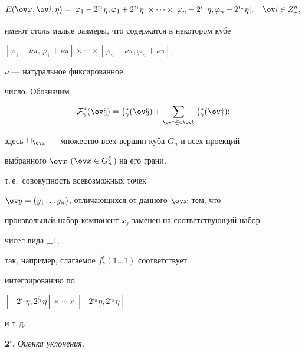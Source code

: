 $$ 


E(\ov\varphi,\ov i,\eta)=[\varphi_1-2^{i_1}\eta, 


\varphi_1+2^{i_1}\eta]\times\dotsb\times 


[\varphi_n-2^{i_n}\eta,


\varphi_n+2^{i_n}\eta],\quad \ov i\in Z^n_+,


$$ 


имеют столь малые размеры, что содержатся в некотором кубе 


$[\varphi_1-\nu\pi,\varphi_1+\nu\pi]\times\dotsb\times 


[\varphi_n-\nu\pi,\varphi_n+\nu\pi]$, 


$\nu$ --- натуральное фиксированное 


число. Обозначим 


\begin{equation} 


\cal F^*_\gamma(\ov x)=f^*_\gamma(\ov x)+ 


\sum_{\ov y\in\Pi{\ov x}}f^*_\gamma(\ov y); 


\end{equation} 


здесь $\Pi_{\ov x}$ --- множество всех вершин куба $G_n$ и всех проекций 


выбранного $\ov x$ ($\ov x\in G^\delta_n$) на его грани, 


т.\,е.~совокупность всевозможных точек 


$\ov y=(y_1\dotsc y_n)$, отличающихся от данного $\ov x$ тем, что 


произвольный набор компонент $x_j$ заменен на соответствующий набор 


чисел вида $\pm1$; 


так, например, слагаемое $f^*_\gamma(1\dotsc 1)$ соответствует 


интегрированию по 


$[-2^{i_1}\eta,2^{i_1}\eta]\times\dotsb\times 


[-2^{i_n}\eta,2^{i_n}\eta]$ 


и т.\,д. 


\pagebreak


 


 


{\bf 2${}^\circ$.} {\it Оценка уклонения.} 


 


